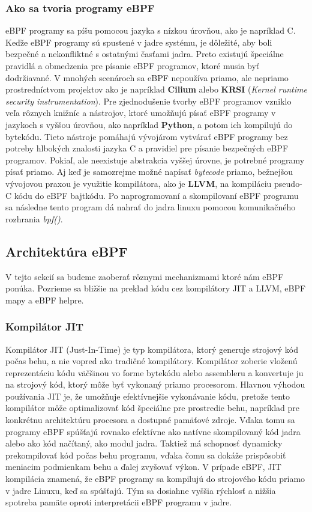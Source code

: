 \subsubsection{Ako sa tvoria programy eBPF}
eBPF programy sa píšu pomocou jazyka s nízkou úrovňou, ako je napríklad C. Keďže eBPF programy sú spustené v jadre systému, je dôležité, 
aby boli bezpečné a nekonfliktné s ostatnými časťami jadra. Preto existujú špeciálne pravidlá a obmedzenia pre písanie eBPF programov, 
ktoré musia byť dodržiavané. V mnohých scenároch sa eBPF nepoužíva priamo, ale nepriamo prostredníctvom projektov ako je napríklad 
\textbf{Cilium} alebo \textbf{KRSI} (\emph{Kernel runtime security instrumentation}). Pre zjednodušenie tvorby eBPF programov vzniklo veľa rôznych 
knižníc a nástrojov, ktoré umožňujú písať eBPF programy v jazykoch s vyššou úrovňou, ako napríklad \textbf{Python}, a potom ich kompilujú do bytekódu. 
Tieto nástroje pomáhajú vývojárom vytvárať eBPF programy bez potreby hlbokých znalosti jazyka C a pravidiel pre písanie bezpečných eBPF programov. 
Pokiaľ, ale neexistuje abstrakcia vyššej úrovne, je potrebné programy písať priamo. Aj keď je samozrejme možné napísať \emph{bytecode} priamo, 
bežnejšou vývojovou praxou je využitie kompilátora, ako je \textbf{LLVM}, na kompiláciu pseudo-C kódu do eBPF bajtkódu. 
Po naprogramovaní a skompilovaní eBPF programu sa následne tento program dá nahrať do jadra linuxu pomocou komunikačného rozhrania \emph{bpf()}.

\subsection{Architektúra eBPF}
\label{sec:architecture}
V tejto sekcií sa budeme zaoberať rôznymi mechanizmami ktoré nám eBPF ponúka. Pozrieme sa bližšie na preklad kódu cez 
kompilátory JIT a LLVM, eBPF mapy a eBPF helpre. 

\subsubsection{Kompilátor JIT}
Kompilátor JIT (Just-In-Time) je typ kompilátora, ktorý generuje strojový kód počas behu, a nie vopred ako tradičné kompilátory. 
Kompilátor zoberie vloženú reprezentáciu kódu  väčšinou vo forme bytekódu alebo assembleru a konvertuje ju na strojový kód, ktorý môže byť vykonaný priamo procesorom. 
Hlavnou výhodou používania JIT je, že umožňuje efektívnejšie vykonávanie kódu, pretože tento kompilátor môže optimalizovať kód špeciálne pre prostredie behu, 
napríklad pre konkrétnu architektúru procesora a dostupné pamäťové zdroje. Vďaka tomu sa programy eBPF spúšťajú rovnako efektívne ako natívne skompilovaný 
kód jadra alebo ako kód načítaný, ako modul jadra. Taktiež má  schopnosť dynamicky prekompilovať kód počas behu programu, vďaka čomu sa dokáže prispôsobiť 
meniacim podmienkam behu a ďalej zvyšovať výkon. V prípade eBPF, JIT kompilácia znamená, že eBPF programy sa kompilujú do strojového kódu priamo v jadre Linuxu, 
keď sa spúšťajú. Tým sa dosiahne vyššia rýchlosť a nižšia spotreba pamäte oproti interpretácii eBPF programu v jadre.

